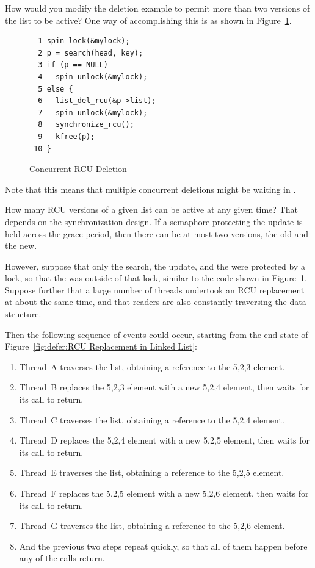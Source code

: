\QuickQ{}
	How would you modify the deletion example to permit more than two
	versions of the list to be active?
\QuickA{}
	One way of accomplishing this is as shown in
	Figure~\ref{fig:defer:Concurrent RCU Deletion}.

\begin{figure}[htbp]
{ \centering
\begin{verbatim}
  1 spin_lock(&mylock);
  2 p = search(head, key);
  3 if (p == NULL)
  4   spin_unlock(&mylock);
  5 else {
  6   list_del_rcu(&p->list);
  7   spin_unlock(&mylock);
  8   synchronize_rcu();
  9   kfree(p);
 10 }
\end{verbatim}
}
\caption{Concurrent RCU Deletion}
\label{fig:defer:Concurrent RCU Deletion}
\end{figure}

	Note that this means that multiple concurrent deletions might be
	waiting in .

\QuickQ{}
	How many RCU versions of a given list can be
	active at any given time?
\QuickA{}
	That depends on the synchronization design.
	If a semaphore protecting the update is held across the grace period,
	then there can be at most two versions, the old and the new.

	However, suppose that only the search, the update, and the
	 were protected by a lock, so that
	the  was outside of that lock, similar
	to the code shown in
	Figure~\ref{fig:defer:Concurrent RCU Deletion}.
	Suppose further that a large number of threads undertook an
	RCU replacement at about the same time, and that readers
	are also constantly traversing the data structure.

	Then the following sequence of events could occur, starting from
	the end state of
	Figure~\ref{fig:defer:RCU Replacement in Linked List}:

	\begin{enumerate}
	\item	Thread~A traverses the list, obtaining a reference to
		the 5,2,3 element.
	\item	Thread~B replaces the 5,2,3 element with a new
		5,2,4 element, then waits for its 
		call to return.
	\item	Thread~C traverses the list, obtaining a reference to
		the 5,2,4 element.
	\item	Thread~D replaces the 5,2,4 element with a new
		5,2,5 element, then waits for its 
		call to return.
	\item	Thread~E traverses the list, obtaining a reference to
		the 5,2,5 element.
	\item	Thread~F replaces the 5,2,5 element with a new
		5,2,6 element, then waits for its 
		call to return.
	\item	Thread~G traverses the list, obtaining a reference to
		the 5,2,6 element.
	\item	And the previous two steps repeat quickly, so that all
		of them happen before any of the 
		calls return.
	\end{enumerate}

